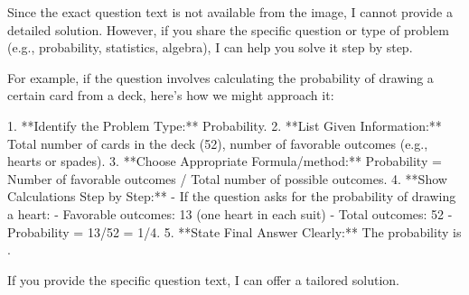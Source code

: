 Since the exact question text is not available from the image, I cannot provide a detailed solution. However, if you share the specific question or type of problem (e.g., probability, statistics, algebra), I can help you solve it step by step.

For example, if the question involves calculating the probability of drawing a certain card from a deck, here's how we might approach it:

1. **Identify the Problem Type:** Probability.
2. **List Given Information:** Total number of cards in the deck (52), number of favorable outcomes (e.g., hearts or spades).
3. **Choose Appropriate Formula/method:** Probability = Number of favorable outcomes / Total number of possible outcomes.
4. **Show Calculations Step by Step:**
   - If the question asks for the probability of drawing a heart:
     - Favorable outcomes: 13 (one heart in each suit)
     - Total outcomes: 52
     - Probability = 13/52 = 1/4.
5. **State Final Answer Clearly:** The probability is .

If you provide the specific question text, I can offer a tailored solution.